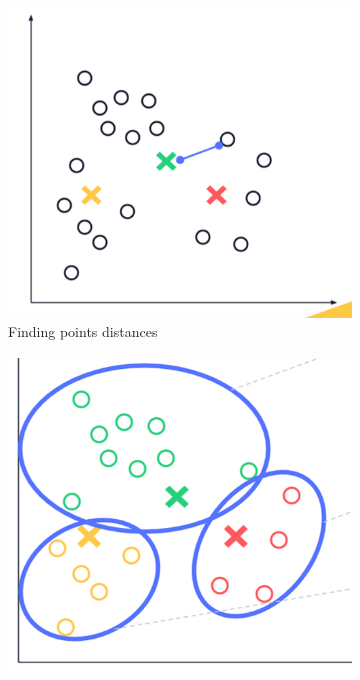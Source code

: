 \begin{figure}[H]
     \centering
     \begin{subfigure}[b]{0.3\textwidth}
         \centering
         \includegraphics[width=\textwidth]{graphics/overview/FIndDistance.png}
         \caption{Finding points distances}
     \end{subfigure}
     \hfill
     \begin{subfigure}[b]{0.3\textwidth}
         \centering
         \includegraphics[width=\textwidth]{graphics/overview/Grouping.png}

\end{subfigure}
\end{figure}
